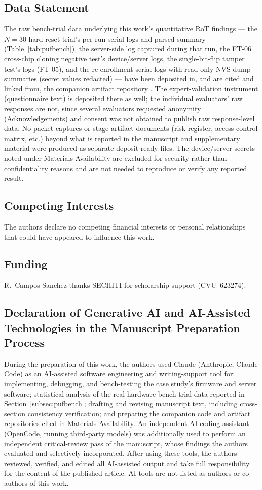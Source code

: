 \documentclass[preprint,12pt,authoryear]{elsarticle}
\begin{document}
\subsection*{Data Statement}
The raw bench-trial data underlying this work's quantitative RoT findings — the $N=30$ hard-reset trial's per-run serial logs and parsed summary (Table~\ref{tab:pufbench}), the server-side log captured during that run, the FT-06 cross-chip cloning negative test's device/server logs, the single-bit-flip tamper test's logs (FT-05), and the re-enrollment serial logs with read-only NVS-dump summaries (secret values redacted) — have been deposited in, and are cited and linked from, the companion artifact repository \citep{camposSanchez2026artifactRepo}. The expert-validation instrument (questionnaire text) is deposited there as well; the individual evaluators' raw responses are not, since several evaluators requested anonymity (Acknowledgements) and consent was not obtained to publish raw response-level data. No packet captures or stage-artifact documents (risk register, access-control matrix, etc.) beyond what is reported in the manuscript and supplementary material were produced as separate deposit-ready files. The device/server secrets noted under Materials Availability are excluded for security rather than confidentiality reasons and are not needed to reproduce or verify any reported result.

\subsection*{Competing Interests}
The authors declare no competing financial interests or personal relationships that could have appeared to influence this work.

\subsection*{Funding}
R.~Campos-Sanchez thanks SECIHTI for scholarship support (CVU~623274).

\subsection*{Declaration of Generative AI and AI-Assisted Technologies in the Manuscript Preparation Process}
During the preparation of this work, the authors used Claude (Anthropic, Claude Code) as an AI-assisted software engineering and writing-support tool for: implementing, debugging, and bench-testing the case study's firmware and server software; statistical analysis of the real-hardware bench-trial data reported in Section~\ref{subsec:pufbench}; drafting and revising manuscript text, including cross-section consistency verification; and preparing the companion code and artifact repositories cited in Materials Availability. An independent AI coding assistant (OpenCode, running third-party models) was additionally used to perform an independent critical-review pass of the manuscript, whose findings the authors evaluated and selectively incorporated. After using these tools, the authors reviewed, verified, and edited all AI-assisted output and take full responsibility for the content of the published article. AI tools are not listed as authors or co-authors of this work.
\end{document}
